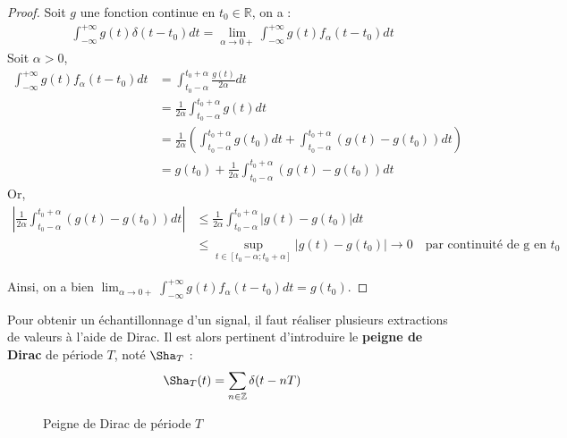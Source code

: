 \begin{proof}
    Soit $g$ une fonction continue en $t_0 \in \mathbb{R}$, on a :
    \begin{align*}
        \int_{-\infty}^{+\infty} g(t) \delta(t - t_0) dt = \lim_{\alpha \to 0+} \int_{-\infty}^{+\infty} g(t) f_{\alpha}(t - t_0) dt
    \end{align*}
    Soit $\alpha > 0$,
    \begin{align*}
        \int_{-\infty}^{+\infty} g(t) f_{\alpha}(t - t_0) dt &= \int_{t_0 - \alpha}^{t_0 + \alpha} \frac{g(t)}{2\alpha} dt \\
        &= \frac{1}{2 \alpha} \int_{t_0 - \alpha}^{t_0 + \alpha} g(t) dt \\
        &= \frac{1}{2 \alpha} \left( \int_{t_0 - \alpha}^{t_0 + \alpha} g(t_0) dt + \int_{t_0 - \alpha}^{t_0 + \alpha} \left( g(t) - g(t_0) \right) dt \right) \\
        &= g(t_0) + \frac{1}{2 \alpha} \int_{t_0 - \alpha}^{t_0 + \alpha} \left( g(t) - g(t_0) \right) dt
    \end{align*}
    Or, 
    \begin{align*}
        \left| \frac{1}{2 \alpha} \int_{t_0 - \alpha}^{t_0 + \alpha} \left( g(t) - g(t_0) \right) dt \right| &\leq \frac{1}{2 \alpha} \int_{t_0 - \alpha}^{t_0 + \alpha} \left| g(t) - g(t_0) \right| dt \\
        &\leq \sup_{t \in \left[ t_0 - \alpha ; t_0 + \alpha \right]} \left| g(t) - g(t_0) \right| \to 0 \quad \text{par continuité de g en $t_0$}
    \end{align*}

    Ainsi, on a bien $\lim_{\alpha \to 0+} \int_{-\infty}^{+\infty} g(t) f_{\alpha}(t - t_0) dt = g(t_0)$.

\end{proof}


Pour obtenir un échantillonnage d'un signal, il faut réaliser plusieurs extractions de valeurs à l'aide de Dirac. Il est alors pertinent d'introduire le \textbf{peigne de Dirac} de période $T$, noté $\Sha_{T}$ :
\begin{align*}
    \Sha_{T}(t) = \sum_{n\in\mathbb{Z}} \delta(t - nT)
\end{align*}

\begin{figure}[h]
    \begin{center}
    \caption{Peigne de Dirac de période $T$}
    \end{center}
\end{figure}

